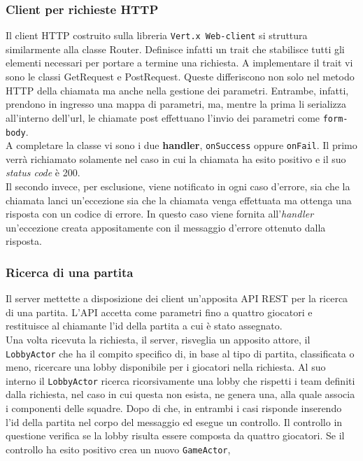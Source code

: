 	\subsubsection{Client per richieste HTTP}
	  Il client HTTP costruito sulla libreria \texttt{Vert.x Web-client} si struttura similarmente alla classe Router. Definisce infatti un trait che stabilisce tutti gli elementi necessari per portare a termine una richiesta. 
	  A implementare il trait vi sono le classi GetRequest e PostRequest. Queste differiscono non solo nel metodo HTTP della chiamata ma anche nella gestione dei parametri. Entrambe, infatti, prendono in ingresso una mappa di parametri, ma, mentre la prima li serializza all'interno dell'url, le chiamate post effettuano l'invio dei parametri come \texttt{form-body}.\\
	  A completare la classe vi sono i due \textbf{handler}, \texttt{onSuccess} oppure \texttt{onFail}. Il primo verrà richiamato solamente nel caso in cui la chiamata ha esito positivo e il suo \textit{status code} è 200. \\
	  Il secondo invece, per esclusione, viene notificato in ogni caso d'errore, sia che la chiamata lanci un'eccezione sia che la chiamata venga effettuata ma ottenga una risposta con un codice di errore. In questo caso viene fornita all'\textit{handler} un'eccezione creata appositamente con il messaggio d'errore ottenuto dalla risposta. 
	  
        \subsubsection{Ricerca di una partita}
          Il server mettette a disposizione dei client un'apposita API REST per la ricerca di una partita. L'API accetta come parametri fino a quattro giocatori e restituisce al chiamante l'id della partita a cui è stato assegnato.
          \\
          Una volta ricevuta la richiesta, il server, risveglia un apposito attore, il \texttt{LobbyActor} che ha il compito specifico di, in base al tipo di partita, classificata o meno, ricercare una lobby disponibile per i giocatori nella richiesta. Al suo interno il \texttt{LobbyActor} ricerca ricorsivamente una lobby che rispetti i team definiti dalla richiesta, nel caso in cui questa non esista, ne genera una, alla quale associa i componenti delle squadre. Dopo di che, in entrambi i casi risponde inserendo l'id della partita nel corpo del messaggio ed esegue un controllo. Il controllo in questione verifica se la lobby risulta essere composta da quattro giocatori. Se il controllo ha esito positivo crea un nuovo \texttt{GameActor},
        
